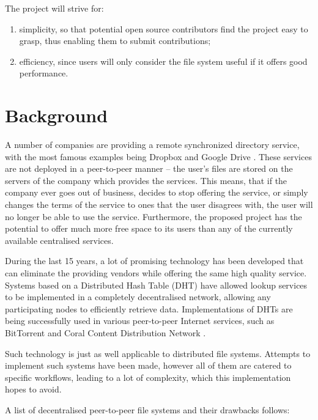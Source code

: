 \documentclass[8pt,a4paper]{article}
\begin{document}
The project will strive for:
\begin{enumerate}
\item simplicity, so that potential open source contributors find the project easy to grasp, thus enabling them to submit contributions;
\item efficiency, since users will only consider the file system useful if it offers good performance.
\end{enumerate}

\section{Background}

A number of companies are providing a remote synchronized directory service, with the most famous examples being Dropbox \cite{dropbox} and Google Drive \cite{gdrive}. These services are not deployed in a peer-to-peer manner -- the user's files are stored on the servers of the company which provides the services. This means, that if the company ever goes out of business, decides to stop offering the service, or simply changes the terms of the service to ones that the user disagrees with, the user will no longer be able to use the service. 
Furthermore, the proposed project has the potential to offer much more free space to its users than any of the currently available centralised services.

During the last 15 years, a lot of promising technology has been developed that can eliminate the providing vendors while offering the same high quality service. 
Systems based on a Distributed Hash Table (DHT) have allowed lookup services to be implemented in a completely decentralised network, allowing any participating nodes to efficiently retrieve data. Implementations of DHTs are being successfully used in various peer-to-peer Internet services, such as BitTorrent and Coral Content Distribution Network \cite{coral}.

Such technology is just as well applicable to distributed file systems. Attempts to implement such systems have been made, however all of them are catered to specific workflows, leading to a lot of complexity, which this implementation hopes to avoid.

A list of decentralised peer-to-peer file systems and their drawbacks follows:
\end{document}
